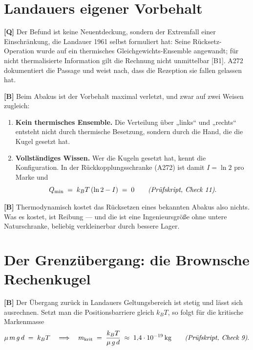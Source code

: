 \section{Landauers eigener Vorbehalt}

\textbf{[Q]} Der Befund ist keine Neuentdeckung, sondern der Extremfall einer
Einschränkung, die Landauer 1961 selbst formuliert hat: Seine Rücksetz-Operation
wurde auf ein thermisches Gleichgewichts-Ensemble angewandt; für nicht
thermalisierte Information gilt die Rechnung nicht unmittelbar [B1]. A272
dokumentiert die Passage und weist nach, dass die Rezeption sie fallen gelassen
hat.

\textbf{[B]} Beim Abakus ist der Vorbehalt maximal verletzt, und zwar auf zwei Weisen
zugleich:

\begin{enumerate}[leftmargin=1.6em,itemsep=0.3em]
  \item \textbf{Kein thermisches Ensemble.} Die Verteilung über „links“ und
        „rechts“ entsteht nicht durch thermische Besetzung, sondern durch die
        Hand, die die Kugel gesetzt hat.
  \item \textbf{Vollständiges Wissen.} Wer die Kugeln gesetzt hat, kennt die
        Konfiguration. In der Rückkopplungsschranke (A272) ist damit
        $I = \ln 2$ pro Marke und
        \begin{equation}
          Q_{\min} \;=\; k_B T\,(\ln 2 - I) \;=\; 0
          \qquad \text{\emph{(Prüfskript, Check 11)}} .
        \end{equation}
\end{enumerate}

\textbf{[B]} Thermodynamisch kostet das Rücksetzen eines bekannten Abakus also nichts. Was
es kostet, ist Reibung --- und die ist eine Ingenieursgröße ohne untere
Naturschranke, beliebig verkleinerbar durch bessere Lager.

\section{Der Grenzübergang: die Brownsche Rechenkugel}

\textbf{[B]} Der Übergang zurück in Landauers Geltungsbereich ist stetig und lässt sich
ausrechnen. Setzt man die Positionsbarriere gleich $k_BT$, so folgt für die
kritische Markenmasse
\begin{equation}
  \mu\,m\,g\,d \;=\; k_B T
  \quad\Longrightarrow\quad
  m_{\text{krit}} \;=\; \frac{k_B T}{\mu\,g\,d} \;\approx\; 1{,}4\cdot10^{-19}\,\text{kg}
  \qquad \text{\emph{(Prüfskript, Check 9)}} .
\end{equation}

